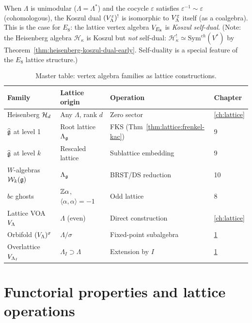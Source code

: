 \begin{remark}
\label{rem:lattice:self-duality}
When $\Lambda$ is unimodular ($\Lambda = \Lambda^*$) and the cocycle
$\varepsilon$ satisfies $\varepsilon^{-1} \sim \varepsilon$ (cohomologous),
the Koszul dual $(V_\Lambda^\varepsilon)^!$ is isomorphic to
$V_\Lambda^\varepsilon$ itself (as a coalgebra). This is the case
for $E_8$: the lattice vertex algebra $V_{E_8}$ is
\emph{Koszul self-dual}. (Note: the Heisenberg algebra $\mathcal{H}_\kappa$ is
Koszul but \emph{not} self-dual: $\mathcal{H}_\kappa^! \simeq \mathrm{Sym}^{ch}(V^*)$
by Theorem~\ref{thm:heisenberg-koszul-dual-early}. Self-duality is a special
feature of the $E_8$ lattice structure.)
\end{remark}

\begin{table}[ht]
\centering
\caption{Master table: vertex algebra families as lattice constructions.}
\label{tab:lattice:master-table}
\begin{tabular}{l l l l}
\textbf{Family} & \textbf{Lattice origin} & \textbf{Operation} & \textbf{Chapter} \\
\hline
Heisenberg $\mathcal{H}_d$
  & Any $\Lambda$, rank $d$ & Zero sector & \ref{ch:lattice} \\
$\widehat{\mathfrak{g}}$ at level 1
  & Root lattice $\Lambda_{\mathfrak{g}}$ & FKS (Thm~\ref{thm:lattice:frenkel-kac}) & 9 \\
$\widehat{\mathfrak{g}}$ at level $k$
  & Rescaled lattice & Sublattice embedding & 9 \\
$W$-algebras $\mathcal{W}_{k}(\mathfrak{g})$
  & $\Lambda_{\mathfrak{g}}$ & BRST/DS reduction & 10 \\
$bc$ ghosts
  & $\mathbb{Z}\alpha$, $\langle\alpha,\alpha\rangle = -1$ & Odd lattice & 8 \\
Lattice VOA $V_\Lambda$
  & $\Lambda$ (even) & Direct construction & \ref{ch:lattice} \\
Orbifold $(V_\Lambda)^\sigma$
  & $\Lambda/\sigma$ & Fixed-point subalgebra & \ref{sec:lattice:functorial} \\
Overlattice $V_{\Lambda_I}$
  & $\Lambda_I \supset \Lambda$ & Extension by $I$ & \ref{sec:lattice:functorial}
\end{tabular}
\end{table}



\section{Functorial properties and lattice operations}
\label{sec:lattice:functorial}

